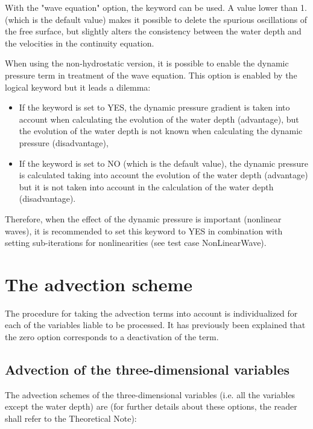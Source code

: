 With the "wave equation" option, the keyword
 can be used.
A value lower than 1. (which is the default value) makes
it possible to delete the spurious oscillations of the free surface, but
slightly alters the consistency between the water depth and the velocities in
the continuity equation.

When using the non-hydrostatic version, it is possible to enable the dynamic
pressure term in treatment of the wave equation. This option is enabled by the
logical keyword  but it leads a
dilemma:

\begin{itemize}
\item If the keyword is set to YES, the dynamic pressure gradient is taken
into account when calculating the evolution of the water depth (advantage), but
the evolution of the water depth is not known when calculating the dynamic
pressure (disadvantage),

\item If the keyword is set to NO (which is the default value), the dynamic
pressure is calculated taking into account the evolution of the water depth
(advantage) but it is not taken into account in the calculation of the water
depth (disadvantage).
\end{itemize}

Therefore, when the effect of the dynamic pressure is important (nonlinear
waves), it is recommended to set this keyword to YES in combination with
setting sub-iterations for nonlinearities (see test case NonLinearWave).


\section{The advection scheme}
\label{sec:advection}
The procedure for taking the advection terms into account is individualized
for each of the variables liable to be processed. It has previously been
explained that the zero option corresponds to a deactivation of the term.


\subsection{Advection of the three-dimensional variables}

The advection schemes of the three-dimensional variables (i.e.
all the variables except the water depth) are (for further details about these
options, the reader shall refer to the Theoretical Note):

